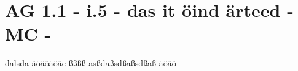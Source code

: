 \section{AG 1.1 - i.5 - das it öind ärteed - MC - }

\begin{beispiel}[AG 1.1]{1}
dalsda äöäöäöäc ßßßß asßdaßsdßaßsdßaß äöäö
\end{beispiel}